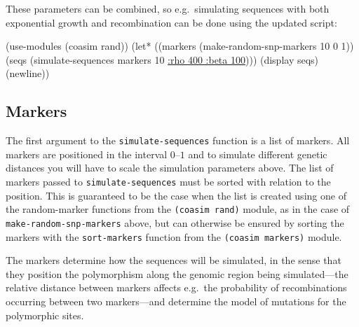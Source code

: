\documentclass{manual}
\begin{document}
These parameters can be combined, so e.g.\ simulating sequences with both
exponential growth and recombination can be done using the updated
script:
\begin{code}
(use-modules (coasim rand))
(let* ((markers (make-random-snp-markers 10 0 1))
       (seqs (simulate-sequences markers 10 \underline{:rho 400 :beta 100})))
  (display seqs)(newline))
\end{code}


\subsection{Markers}
\label{sec:markers}

The first argument to the \texttt{simulate-sequences} function is a
list of markers.  All markers are positioned in the interval $0$--$1$
and to simulate different genetic distances you will have to scale the
simulation parameters above.  The list of markers passed to
\texttt{simulate-sequences} must be sorted with relation to the
position.  This is guaranteed to be the case when the list is created
using one of the random-marker functions from the \texttt{(coasim
  rand)} module, as in the case of \texttt{make-random-snp-markers}
above, but can otherwise be ensured by sorting the markers with the
\texttt{sort-markers} function from the \texttt{(coasim markers)}
module.

The markers determine how the sequences will be simulated, in the
sense that they position the polymorphism along the genomic region
being simulated---the relative distance between markers affects e.g.\ 
the probability of recombinations occurring between two markers---and
determine the model of mutations for the polymorphic sites.
\end{document}
